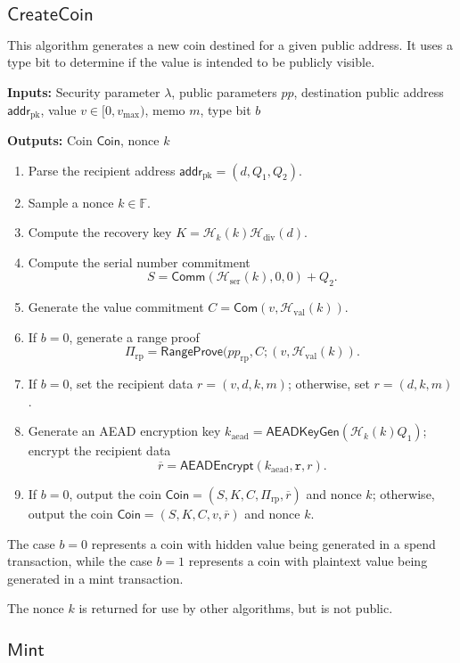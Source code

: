 \documentclass{llncs}
\newcommand{\F}{\mathbb{F}}
\newcommand{\hash}{\mathcal{H}}
\newcommand{\func}[1]{\mathsf{#1}}
\newcommand{\addr}{\func{addr}}
\newcommand{\com}{\func{Com}}
\newcommand{\comm}{\func{Comm}}
\begin{document}
\subsection{\texorpdfstring{$\func{CreateCoin}$}{CreateCoin}}

This algorithm generates a new coin destined for a given public address.
It uses a type bit to determine if the value is intended to be publicly visible.

\textbf{Inputs:} Security parameter $\lambda$, public parameters $pp$, destination public address $\addr_{\text{pk}}$, value $v \in [0, v_{\text{max}})$, memo $m$, type bit $b$

\textbf{Outputs:} Coin $\func{Coin}$, nonce $k$

\begin{enumerate}
\item Parse the recipient address $\addr_{\text{pk}} = (d, Q_1, Q_2)$.
\item Sample a nonce $k \in \F$.
\item Compute the recovery key $K = \hash_k(k)\hash_{\text{div}}(d)$.
\item Compute the serial number commitment $$S = \comm(\hash_{\text{ser}}(k), 0, 0) + Q_2.$$
\item Generate the value commitment $C = \com(v, \hash_{\text{val}}(k))$.
\item If $b=0$, generate a range proof $$\Pi_{\text{rp}} = \func{RangeProve}(pp_{\text{rp}},C;(v,\hash_{\text{val}}(k)).$$
\item If $b = 0$, set the recipient data $r = (v,d,k,m)$; otherwise, set $r = (d,k,m)$.
\item Generate an AEAD encryption key $k_{\text{aead}} = \func{AEADKeyGen}(\hash_k(k)Q_1)$; encrypt the recipient data $$\overline{r} = \func{AEADEncrypt}(k_{\text{aead}},\texttt{r},r).$$
\item If $b=0$, output the coin $\func{Coin} = (S, K, C, \Pi_{\text{rp}}, \overline{r})$ and nonce $k$; otherwise, output the coin $\func{Coin} = (S, K, C, v, \overline{r})$ and nonce $k$.
\end{enumerate}
The case $b=0$ represents a coin with hidden value being generated in a spend transaction, while the case $b=1$ represents a coin with plaintext value being generated in a mint transaction.

The nonce $k$ is returned for use by other algorithms, but is not public.


\subsection{\texorpdfstring{$\func{Mint}$}{Mint}}
\end{document}
